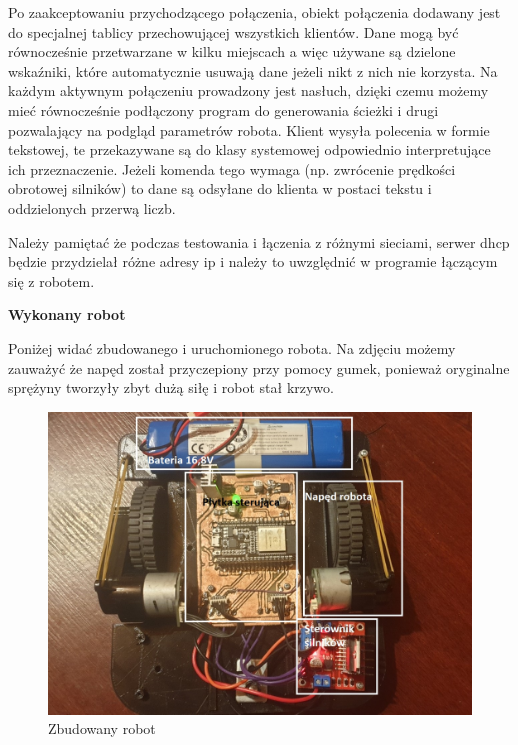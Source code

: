 Po zaakceptowaniu przychodzącego połączenia, obiekt połączenia dodawany jest do specjalnej tablicy przechowującej wszystkich klientów. 
Dane mogą być równocześnie przetwarzane w kilku miejscach a więc używane są dzielone wskaźniki, które automatycznie usuwają dane jeżeli nikt z nich nie korzysta.
Na każdym aktywnym połączeniu prowadzony jest nasłuch, dzięki czemu możemy mieć równocześnie podłączony program do generowania ścieżki i drugi pozwalający na podgląd parametrów robota.
Klient wysyła polecenia w formie tekstowej, te przekazywane są do klasy systemowej odpowiednio interpretujące ich przeznaczenie.
Jeżeli komenda tego wymaga (np. zwrócenie prędkości obrotowej silników) to dane są odsyłane do klienta w postaci tekstu i oddzielonych przerwą liczb. 

Należy pamiętać że podczas testowania i łączenia z różnymi sieciami, serwer dhcp będzie przydzielał różne adresy ip i należy to uwzględnić w programie łączącym się z robotem.


\textbf{Wykonany robot}

Poniżej widać zbudowanego i uruchomionego robota. Na zdjęciu możemy zauważyć że napęd został przyczepiony przy pomocy gumek, ponieważ 
oryginalne sprężyny tworzyły zbyt dużą siłę i robot stał krzywo. 

\begin{figure}[H]
	\centering
	\includegraphics[width=15cm]{pages/robot/zdjecia/robotCaly.jpg}
	\caption{Zbudowany robot}
	\label{Fig:zbudowanyRobot}
\end{figure}